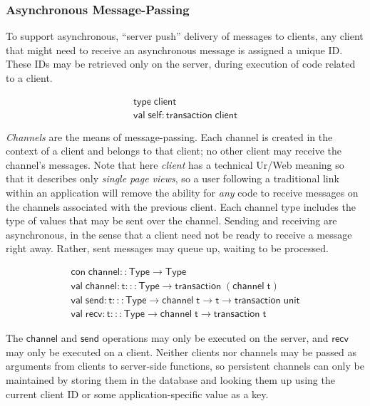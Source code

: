 \documentclass{article}
\newcommand{\mt}[1]{\mathsf{#1}}
\begin{document}
\subsubsection{Asynchronous Message-Passing}

To support asynchronous, ``server push'' delivery of messages to clients, any client that might need to receive an asynchronous message is assigned a unique ID.  These IDs may be retrieved only on the server, during execution of code related to a client.

$$\begin{array}{l}
  \mt{type} \; \mt{client} \\
  \mt{val} \; \mt{self} : \mt{transaction} \; \mt{client}
\end{array}$$

\emph{Channels} are the means of message-passing.  Each channel is created in the context of a client and belongs to that client; no other client may receive the channel's messages.  Note that here \emph{client} has a technical Ur/Web meaning so that it describes only \emph{single page views}, so a user following a traditional link within an application will remove the ability for \emph{any} code to receive messages on the channels associated with the previous client.  Each channel type includes the type of values that may be sent over the channel.  Sending and receiving are asynchronous, in the sense that a client need not be ready to receive a message right away.  Rather, sent messages may queue up, waiting to be processed.

$$\begin{array}{l}
  \mt{con} \; \mt{channel} :: \mt{Type} \to \mt{Type} \\
  \mt{val} \; \mt{channel} : \mt{t} ::: \mt{Type} \to \mt{transaction} \; (\mt{channel} \; \mt{t}) \\
  \mt{val} \; \mt{send} : \mt{t} ::: \mt{Type} \to \mt{channel} \; \mt{t} \to \mt{t} \to \mt{transaction} \; \mt{unit} \\
  \mt{val} \; \mt{recv} : \mt{t} ::: \mt{Type} \to \mt{channel} \; \mt{t} \to \mt{transaction} \; \mt{t}
\end{array}$$

The $\mt{channel}$ and $\mt{send}$ operations may only be executed on the server, and $\mt{recv}$ may only be executed on a client.  Neither clients nor channels may be passed as arguments from clients to server-side functions, so persistent channels can only be maintained by storing them in the database and looking them up using the current client ID or some application-specific value as a key.
\end{document}
